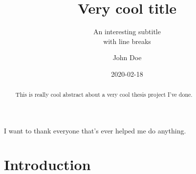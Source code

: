 

\usepackage{parskip}

\title{Very cool title}
\author{John Doe}
\date{2020-02-18}
\subtitle{An interesting subtitle \\with line breaks}







\maketitlepage{}

\begin{abstract}
  This is really cool abstract about a very cool thesis project I've done.
\end{abstract}

\begin{acknowledgements}
  I want to thank everyone that's ever helped me do anything.
\end{acknowledgements}

\makelists{}

\chapter{Introduction}

\lipsum[1-3]

